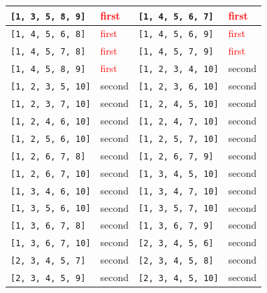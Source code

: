 \begin{longtable}{|p{3.5cm}|p{2.5cm}||p{3.5cm}|p{2.5cm}|}
\texttt{[1, 3, 5, 8, 9]} & \textcolor{red}{first} & \texttt{[1, 4, 5, 6, 7]} & \textcolor{red}{first} \\ \hline
\texttt{[1, 4, 5, 6, 8]} & \textcolor{red}{first} & \texttt{[1, 4, 5, 6, 9]} & \textcolor{red}{first} \\ \hline
\texttt{[1, 4, 5, 7, 8]} & \textcolor{red}{first} & \texttt{[1, 4, 5, 7, 9]} & \textcolor{red}{first} \\ \hline
\texttt{[1, 4, 5, 8, 9]} & \textcolor{red}{first} & \texttt{[1, 2, 3, 4, 10]} & \textcolor{CustomBlue}{second} \\ \hline
\texttt{[1, 2, 3, 5, 10]} & \textcolor{CustomBlue}{second} & \texttt{[1, 2, 3, 6, 10]} & \textcolor{CustomBlue}{second} \\ \hline
\texttt{[1, 2, 3, 7, 10]} & \textcolor{CustomBlue}{second} & \texttt{[1, 2, 4, 5, 10]} & \textcolor{CustomBlue}{second} \\ \hline
\texttt{[1, 2, 4, 6, 10]} & \textcolor{CustomBlue}{second} & \texttt{[1, 2, 4, 7, 10]} & \textcolor{CustomBlue}{second} \\ \hline
\texttt{[1, 2, 5, 6, 10]} & \textcolor{CustomBlue}{second} & \texttt{[1, 2, 5, 7, 10]} & \textcolor{CustomBlue}{second} \\ \hline
\texttt{[1, 2, 6, 7, 8]} & \textcolor{CustomBlue}{second} & \texttt{[1, 2, 6, 7, 9]} & \textcolor{CustomBlue}{second} \\ \hline
\texttt{[1, 2, 6, 7, 10]} & \textcolor{CustomBlue}{second} & \texttt{[1, 3, 4, 5, 10]} & \textcolor{CustomBlue}{second} \\ \hline
\texttt{[1, 3, 4, 6, 10]} & \textcolor{CustomBlue}{second} & \texttt{[1, 3, 4, 7, 10]} & \textcolor{CustomBlue}{second} \\ \hline
\texttt{[1, 3, 5, 6, 10]} & \textcolor{CustomBlue}{second} & \texttt{[1, 3, 5, 7, 10]} & \textcolor{CustomBlue}{second} \\ \hline
\texttt{[1, 3, 6, 7, 8]} & \textcolor{CustomBlue}{second} & \texttt{[1, 3, 6, 7, 9]} & \textcolor{CustomBlue}{second} \\ \hline
\texttt{[1, 3, 6, 7, 10]} & \textcolor{CustomBlue}{second} & \texttt{[2, 3, 4, 5, 6]} & \textcolor{CustomBlue}{second} \\ \hline
\texttt{[2, 3, 4, 5, 7]} & \textcolor{CustomBlue}{second} & \texttt{[2, 3, 4, 5, 8]} & \textcolor{CustomBlue}{second} \\ \hline
\texttt{[2, 3, 4, 5, 9]} & \textcolor{CustomBlue}{second} & \texttt{[2, 3, 4, 5, 10]} & \textcolor{CustomBlue}{second} \\ \hline

\end{longtable}
